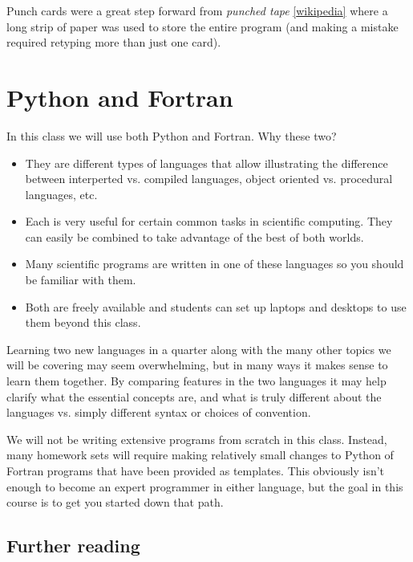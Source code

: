 \documentclass[letterpaper,10pt,english]{sphinxmanual}
\begin{document}
Punch cards were a great step forward from \emph{punched tape} \href{http://en.wikipedia.org/wiki/Punched\_tape}{{[}wikipedia{]}} where a long strip of paper
was used to store the entire program (and making a mistake required retyping
more than just one card).


\section{Python and Fortran}
\label{python_and_fortran:python-and-fortran}\label{python_and_fortran::doc}\label{python_and_fortran:id1}
In this class we will use both Python and Fortran.  Why these two?
\begin{itemize}
\item {} 
They are different types of languages that allow illustrating the
difference between interperted vs. compiled languages, object oriented
vs. procedural languages, etc.

\item {} 
Each is very useful for certain common tasks in scientific computing.
They can easily be combined to take advantage of the best of both worlds.

\item {} 
Many scientific programs are written in one of these languages so you
should be familiar with them.

\item {} 
Both are freely available and students can set up laptops and desktops to
use them beyond this class.

\end{itemize}

Learning two new languages in a quarter along with the many other topics we
will be covering may seem overwhelming, but in many ways it makes sense to
learn them together.  By comparing features in the two languages it may help
clarify what the essential concepts are, and what is truly different about
the languages vs. simply different syntax or choices of convention.

We will not be writing extensive programs from scratch in this class.
Instead, many homework sets will require making relatively small changes to
Python of Fortran programs that have been provided as templates.  This
obviously isn't enough to become an expert programmer in either language,
but the goal in this course is to get you started down that path.


\subsection{Further reading}
\label{python_and_fortran:further-reading}
\end{document}
